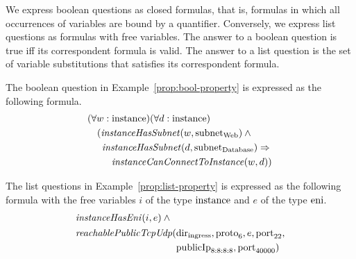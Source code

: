 We express boolean questions as closed formulas, that is, formulas in which all occurrences of variables are bound by a quantifier. Conversely, we express list questions as formulas with free variables. The answer to a boolean question is true iff its correspondent formula is valid. The answer to a list question is the set of variable substitutions that satisfies its correspondent formula.

The boolean question in Example~\ref{prop:bool-property} is expressed as the following formula.
\begin{equation}\label{eq:bool-property}
\begin{aligned}
&(\forall w:\mathrm{instance})(\forall d:\mathrm{instance})\\
&\quad(\mathit{instanceHasSubnet}(w, \mathrm{subnet}_\text{Web})\:\wedge\:\\
&\quad\,\,\,\mathit{instanceHasSubnet}(d, \mathrm{subnet}_\text{Database}) \Rightarrow~\\
&\quad\,\,\,\quad\mathit{instanceCanConnectToInstance}(w,d))
\end{aligned}
\end{equation}


The list questions in Example~\ref{prop:list-property} is expressed as the following formula with the free variables $i$ of the type $\mathrm{instance}$ and $e$ of the type $\mathrm{eni}$. 
\begin{equation}\label{eq:list-property}
\begin{aligned}
&\mathit{instanceHasEni}(i,e)\:\wedge~\\
&\begin{aligned}
   \mathit{reachablePublicTcpUdp}(&\mathrm{dir}_\text{ingress}, \mathrm{proto}_6, e, \mathrm{port}_{22},\\
                                &\mathrm{publicIp}_\text{8:8:8:8}, \mathrm{port}_\text{40000})
 \end{aligned}
\end{aligned}
\end{equation}

